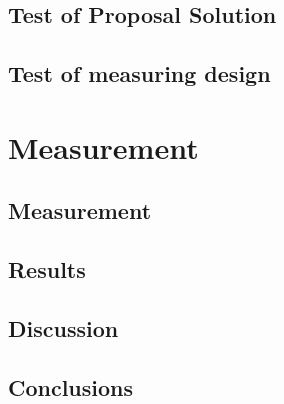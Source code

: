 \chapter{Test of Proposal Solution}\label{ch:test_of_proposal_sol}


\chapter{Test of measuring design}\label{ch:test_of_meas_des}



\part{Measurement}\label{pt:measurement}
\graphicspath{{figures/measurement/}}

\chapter{Measurement}\label{ch:measurement}





\graphicspath{{figures/result/}}

\chapter{Results}\label{sec:results}


\chapter{Discussion}\label{sec:discussion}


\chapter{Conclusions}\label{sec:conclusion}


 




\glsresetall
\appendix %

